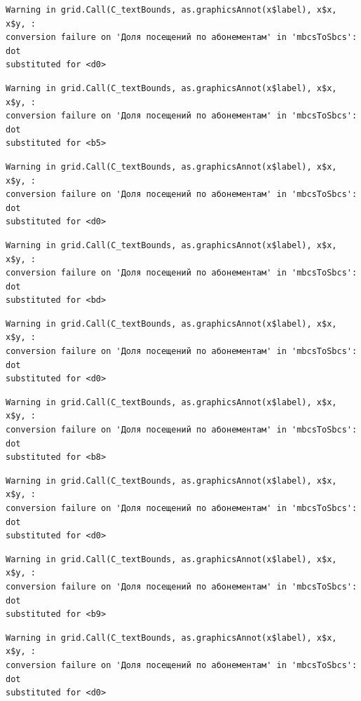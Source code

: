 \documentclass[
  letterpaper,
  DIV=11,
  numbers=noendperiod]{scrartcl}
\begin{document}
\begin{verbatim}
Warning in grid.Call(C_textBounds, as.graphicsAnnot(x$label), x$x, x$y, :
conversion failure on 'Доля посещений по абонементам' in 'mbcsToSbcs': dot
substituted for <d0>
\end{verbatim}

\begin{verbatim}
Warning in grid.Call(C_textBounds, as.graphicsAnnot(x$label), x$x, x$y, :
conversion failure on 'Доля посещений по абонементам' in 'mbcsToSbcs': dot
substituted for <b5>
\end{verbatim}

\begin{verbatim}
Warning in grid.Call(C_textBounds, as.graphicsAnnot(x$label), x$x, x$y, :
conversion failure on 'Доля посещений по абонементам' in 'mbcsToSbcs': dot
substituted for <d0>
\end{verbatim}

\begin{verbatim}
Warning in grid.Call(C_textBounds, as.graphicsAnnot(x$label), x$x, x$y, :
conversion failure on 'Доля посещений по абонементам' in 'mbcsToSbcs': dot
substituted for <bd>
\end{verbatim}

\begin{verbatim}
Warning in grid.Call(C_textBounds, as.graphicsAnnot(x$label), x$x, x$y, :
conversion failure on 'Доля посещений по абонементам' in 'mbcsToSbcs': dot
substituted for <d0>
\end{verbatim}

\begin{verbatim}
Warning in grid.Call(C_textBounds, as.graphicsAnnot(x$label), x$x, x$y, :
conversion failure on 'Доля посещений по абонементам' in 'mbcsToSbcs': dot
substituted for <b8>
\end{verbatim}

\begin{verbatim}
Warning in grid.Call(C_textBounds, as.graphicsAnnot(x$label), x$x, x$y, :
conversion failure on 'Доля посещений по абонементам' in 'mbcsToSbcs': dot
substituted for <d0>
\end{verbatim}

\begin{verbatim}
Warning in grid.Call(C_textBounds, as.graphicsAnnot(x$label), x$x, x$y, :
conversion failure on 'Доля посещений по абонементам' in 'mbcsToSbcs': dot
substituted for <b9>
\end{verbatim}

\begin{verbatim}
Warning in grid.Call(C_textBounds, as.graphicsAnnot(x$label), x$x, x$y, :
conversion failure on 'Доля посещений по абонементам' in 'mbcsToSbcs': dot
substituted for <d0>
\end{verbatim}
\end{document}
